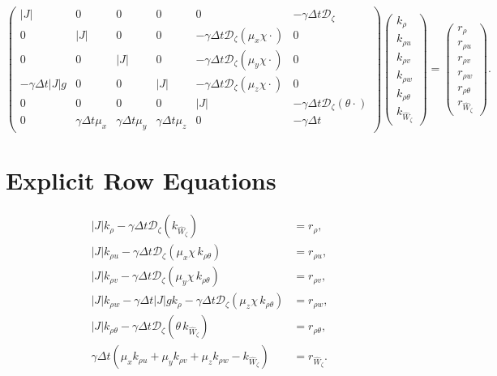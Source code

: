 \documentclass[11pt,a4paper]{article}
\begin{document}
		\begin{equation}
			\begin{pmatrix}
				|J| & 0 & 0 & 0 & 0 & -\gamma \Delta t \mathcal{D}_\zeta \\[10pt]
				0 & |J| & 0 & 0 & -\gamma \Delta t \mathcal{D}_\zeta \left( \mu_x \chi \cdot \right) & 0 \\[10pt]
				0 & 0 & |J| & 0 & -\gamma \Delta t \mathcal{D}_\zeta \left( \mu_y \chi \cdot \right) & 0 \\[10pt]
				-\gamma \Delta t |J| g & 0 & 0 & |J| & -\gamma \Delta t \mathcal{D}_\zeta \left( \mu_z \chi \cdot \right) & 0 \\[10pt]
				0 & 0 & 0 & 0 & |J| & -\gamma \Delta t \mathcal{D}_\zeta (\theta \cdot) \\[10pt]
				0 & \gamma \Delta t \mu_x & \gamma \Delta t \mu_y & \gamma \Delta t \mu_z & 0 & -\gamma \Delta t
			\end{pmatrix}
			\begin{pmatrix}
				k_\rho \\[10pt]
				k_{\rho u} \\[10pt]
				k_{\rho v} \\[10pt]
				k_{\rho w} \\[10pt]
				k_{\rho \theta} \\[10pt]
				k_{\widehat{W}_\zeta}
			\end{pmatrix}
			=
			\begin{pmatrix}
				r_\rho \\[10pt]
				r_{\rho u} \\[10pt]
				r_{\rho v} \\[10pt]
				r_{\rho w} \\[10pt]
				r_{\rho \theta} \\[10pt]
				r_{\widehat{W}_\zeta}
			\end{pmatrix}.
		\end{equation}
		
		\section{Explicit Row Equations}
		
		\begin{align}
			|J| k_\rho - \gamma \Delta t \mathcal{D}_\zeta \left( k_{\widehat{W}_\zeta} \right) &= r_\rho, \\[6pt]
			|J| k_{\rho u} - \gamma \Delta t \mathcal{D}_\zeta \left( \mu_x \chi \, k_{\rho \theta} \right) &= r_{\rho u}, \\[6pt]
			|J| k_{\rho v} - \gamma \Delta t \mathcal{D}_\zeta \left( \mu_y \chi \, k_{\rho \theta} \right) &= r_{\rho v}, \\[6pt]
			|J| k_{\rho w} - \gamma \Delta t |J| g k_\rho - \gamma \Delta t \mathcal{D}_\zeta \left( \mu_z \chi \, k_{\rho \theta} \right) &= r_{\rho w}, \\[6pt]
			|J| k_{\rho \theta} - \gamma \Delta t \mathcal{D}_\zeta \left( \theta \, k_{\widehat{W}_\zeta} \right) &= r_{\rho \theta}, \\[6pt]
			\gamma \Delta t \left( \mu_x k_{\rho u} + \mu_y k_{\rho v} + \mu_z k_{\rho w} - k_{\widehat{W}_\zeta} \right) &= r_{\widehat{W}_\zeta}.
		\end{align}
		
\end{document}
